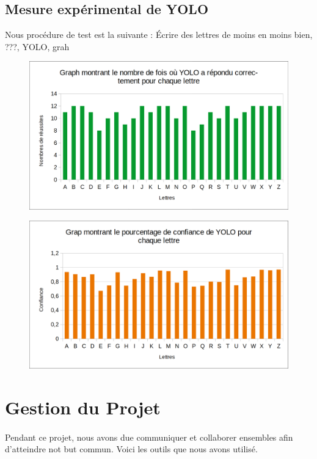 \documentclass[a4paper]{article}
\begin{document}
		\subsection{Mesure expérimental de YOLO}
			Nous procédure de test est la suivante : Écrire des lettres de moins en moins bien, ???, YOLO, grah
			\begin{figure}[H]
				\caption{}
				\includegraphics[width=\textwidth]{grapYoloReussite.png}
				\centering
				\label{fig:graph:reussite}
			\end{figure}
			\begin{figure}[H]
				\caption{}
				\includegraphics[width=\textwidth]{grapYoloConfiance.png}
				\centering
				\label{fig:graph:confiance}
			\end{figure}
	\section{Gestion du Projet}
		\paragraph{} Pendant ce projet, nous avons due communiquer et collaborer ensembles afin d'atteindre not but commun. Voici les outils que nous avons utilisé.
\end{document}
